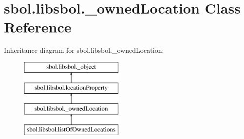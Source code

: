 \hypertarget{classsbol_1_1libsbol_1_1__owned_location}{}\section{sbol.\+libsbol.\+\_\+owned\+Location Class Reference}
\label{classsbol_1_1libsbol_1_1__owned_location}
Inheritance diagram for sbol.\+libsbol.\+\_\+owned\+Location\+:\begin{figure}[H]
\begin{center}
\leavevmode
\includegraphics[height=4.000000cm]{classsbol_1_1libsbol_1_1__owned_location}
\end{center}
\end{figure}
